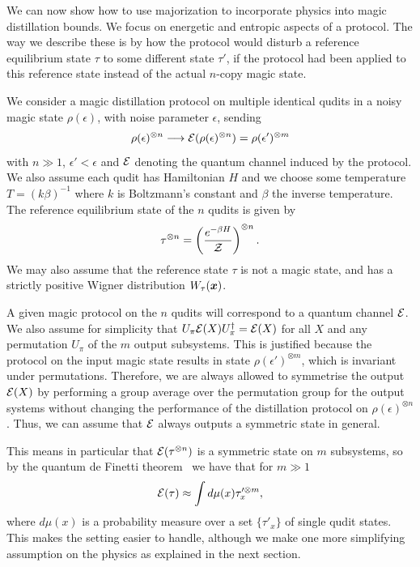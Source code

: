 \documentclass[pra,
aps,
twocolumn,
superscriptaddress,
groupedaddress,
nofootinbib,
reprint
]{revtex4-1}
\begin{document}
We can now show how to use majorization to incorporate physics into magic distillation bounds. We focus on energetic and entropic aspects of a protocol. The way we describe these is by how the protocol would disturb a reference equilibrium state $\tau$ to some different state $\tau'$, if the protocol had been applied to this reference state instead of the actual $n$-copy magic state. 

We consider a magic distillation protocol on multiple identical qudits in a noisy magic state $\rho(\epsilon)$, with noise parameter $\epsilon$, sending 
\begin{equation}
\rho(\epsilon)^{\otimes n} \longrightarrow {\mathcal E}(\rho(\epsilon)^{\otimes n}) =\rho(\epsilon')^{\otimes m}
\end{equation}
with $n \gg 1$, $\epsilon' <\epsilon$ and ${\mathcal E}$ denoting the quantum channel induced by the protocol. We also assume each qudit has Hamiltonian $H$ and we choose some temperature $T = (k\beta)^{-1}$ where $k$ is Boltzmann's constant and $\beta$ the inverse temperature. The reference equilibrium state of the $n$ qudits is given by
\begin{equation}
\tau^{\otimes n} = \left ( \frac{e^{-\beta H}}{\mathcal{Z}} \right )  ^{\otimes n}.
\end{equation}
We may also assume that the reference state $\tau$ is not a magic state, and has a strictly positive Wigner distribution $W_\tau(\boldsymbol{x})$.

A given magic protocol on the $n$ qudits will correspond to a quantum channel ${\mathcal E}$. We also assume for simplicity that $U_\pi{\mathcal E}(X) U_\pi^\dagger = {\mathcal E}(X)$ for all $X$ and any permutation $U_\pi$ of the $m$ output subsystems. This is justified because the protocol on the input magic state results in state $\rho(\epsilon')^{\otimes m}$, which is invariant under permutations. Therefore, we are always allowed to symmetrise the output ${\mathcal E}(X)$ by performing a group average over the permutation group for the output systems without changing the performance of the distillation protocol on $\rho(\epsilon)^{\otimes n}$. Thus, we can assume that ${\mathcal E}$ always outputs a symmetric state in general.

This means in particular that ${\mathcal E}(\tau^{\otimes n})$ is a symmetric state on $m$ subsystems, so by the quantum de Finetti theorem~\cite{christandl_2007} we have that for $m \gg 1$
\begin{equation}
{\mathcal E}(\tau) \approx \int d\mu(x) \tau_x^{\prime \otimes m},
\end{equation}
where $d\mu(x)$ is a probability measure over a set $\{\tau'_x\}$ of single qudit states. This makes the setting easier to handle, although we make one more simplifying assumption on the physics as explained in the next section.
\end{document}
